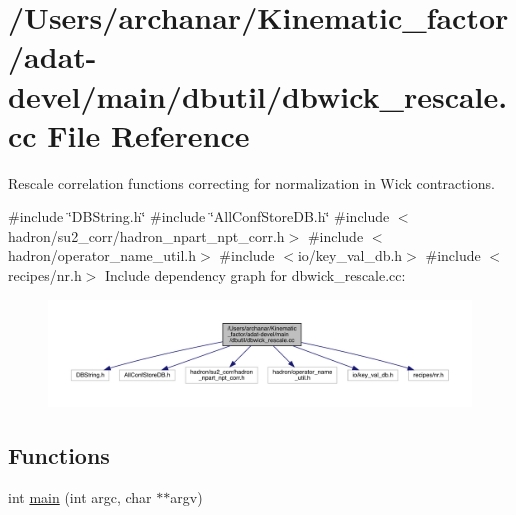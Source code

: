 \hypertarget{adat-devel_2main_2dbutil_2dbwick__rescale_8cc}{}\section{/\+Users/archanar/\+Kinematic\+\_\+factor/adat-\/devel/main/dbutil/dbwick\+\_\+rescale.cc File Reference}
\label{adat-devel_2main_2dbutil_2dbwick__rescale_8cc}


Rescale correlation functions correcting for normalization in Wick contractions.  


{\ttfamily \#include \char`\"{}D\+B\+String.\+h\char`\"{}}\newline
{\ttfamily \#include \char`\"{}All\+Conf\+Store\+D\+B.\+h\char`\"{}}\newline
{\ttfamily \#include $<$hadron/su2\+\_\+corr/hadron\+\_\+npart\+\_\+npt\+\_\+corr.\+h$>$}\newline
{\ttfamily \#include $<$hadron/operator\+\_\+name\+\_\+util.\+h$>$}\newline
{\ttfamily \#include $<$io/key\+\_\+val\+\_\+db.\+h$>$}\newline
{\ttfamily \#include $<$recipes/nr.\+h$>$}\newline
Include dependency graph for dbwick\+\_\+rescale.\+cc\+:
\nopagebreak
\begin{figure}[H]
\begin{center}
\leavevmode
\includegraphics[width=350pt]{d6/d41/adat-devel_2main_2dbutil_2dbwick__rescale_8cc__incl}
\end{center}
\end{figure}
\subsection*{Functions}
\begin{DoxyCompactItemize}
\item 
int \mbox{\hyperlink{adat-devel_2main_2dbutil_2dbwick__rescale_8cc_a3c04138a5bfe5d72780bb7e82a18e627}{main}} (int argc, char $\ast$$\ast$argv)
\end{DoxyCompactItemize}


